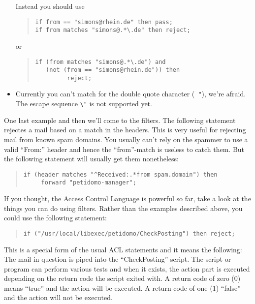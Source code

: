 \documentclass[a4paper,11pt]{scrreprt}
\begin{document}
\begin{itemize}
Instead you should use
\begin{quote}
\begin{verbatim}
if from == "simons@rhein.de" then pass;
if from matches "simons@.*\.de" then reject;
\end{verbatim}
\end{quote}
or
\begin{quote}
\begin{verbatim}
if (from matches "simons@.*\.de") and
   (not (from == "simons@rhein.de")) then
         reject;
\end{verbatim}
\end{quote}

\item Currently you can't match for the double quote character ({\tt
"}), we're afraid. The escape sequence {\tt \verb+\+"} is not
supported yet.

\end{itemize}

One last example and then we'll come to the filters. The following
statement rejectes a mail based on a match in the headers. This is
very useful for rejecting mail from known spam domains. You usually
can't rely on the spammer to use a valid ``From:'' header and hence
the ``from''-match is useless to catch them. But the following
statement will usually get them nonetheless:
\begin{quote}
\begin{verbatim}
if (header matches "^Received:.*from spam.domain") then
     forward "petidomo-manager";
\end{verbatim}
\end{quote}

If you thought, the Access Control Language is powerful so far, take a
look at the things you can do using filters. Rather than the examples
described above, you could use the following statement:
\begin{quote}
\begin{verbatim}
if ("/usr/local/libexec/petidomo/CheckPosting") then reject;
\end{verbatim}
\end{quote}

This is a special form of the usual ACL statements and it means the
following: The mail in question is piped into the ``CheckPosting''
script. The script or program can perform various tests and when it
exists, the action part is executed depending on the return code the
script exited with. A return code of zero (0) means ``true'' and the
action will be executed. A return code of one (1) ``false'' and the
action will not be executed.
\end{document}
